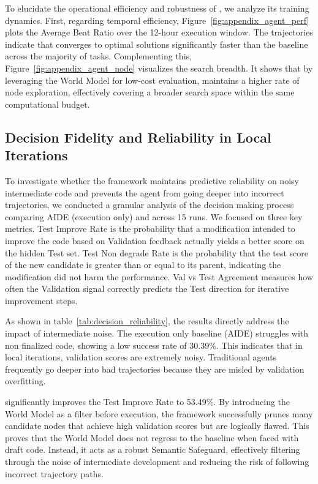 To elucidate the operational efficiency and robustness of \ours, we analyze its training dynamics.
First, regarding temporal efficiency, Figure~\ref{fig:appendix_agent_perf} plots the Average Beat Ratio over the 12-hour execution window.
The trajectories indicate that \ours converges to optimal solutions significantly faster than the baseline across the majority of tasks.
Complementing this, Figure~\ref{fig:appendix_agent_node} visualizes the search breadth.
It shows that by leveraging the World Model for low-cost evaluation, \ours maintains a higher rate of node exploration, effectively covering a broader search space within the same computational budget.


\subsection{Decision Fidelity and Reliability in Local Iterations}
\label{app:fidelity_analysis}

To investigate whether the framework maintains predictive reliability on noisy intermediate code and prevents the agent from going deeper into incorrect trajectories, we conducted a granular analysis of the decision making process comparing AIDE (execution only) and \ours across 15 runs.
We focused on three key metrics.
Test Improve Rate is the probability that a modification intended to improve the code based on Validation feedback actually yields a better score on the hidden Test set.
Test Non degrade Rate is the probability that the test score of the new candidate is greater than or equal to its parent, indicating the modification did not harm the performance.
Val vs Test Agreement measures how often the Validation signal correctly predicts the Test direction for iterative improvement steps.

As shown in table~\ref{tab:decision_reliability}, the results directly address the impact of intermediate noise.
The execution only baseline (AIDE) struggles with non finalized code, showing a low success rate of 30.39\%.
This indicates that in local iterations, validation scores are extremely noisy.
Traditional agents frequently go deeper into bad trajectories because they are misled by validation overfitting.

\ours significantly improves the Test Improve Rate to 53.49\%.
By introducing the World Model as a filter before execution, the framework successfully prunes many candidate nodes that achieve high validation scores but are logically flawed.
This proves that the World Model does not regress to the baseline when faced with draft code. Instead, it acts as a robust Semantic Safeguard, effectively filtering through the noise of intermediate development and reducing the risk of following incorrect trajectory paths.

